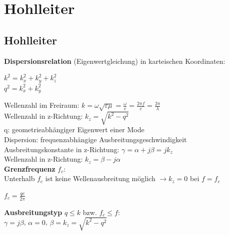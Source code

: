 \documentclass[english]{latex4ei/latex4ei_sheet}
\begin{document}
\section{Hohlleiter}
\begin{sectionbox}
	\subsection{Hohlleiter}
	\textbf{Dispersionsrelation} (Eigenwertgleichung) in karteischen Koordinaten:
	\begin{emphbox}
		$k^{2}=k_{x}^{2}+k_{y}^{2}+k_{z}^{2}$\\
		$q^2 = k_{x}^{2}+k_{y}^{2}$
	\end{emphbox}
	Wellenzahl im Freiraum: $k = \omega\sqrt{\varepsilon \mu} = \frac{\omega}{c} = \frac{2\pi f}{c} = \frac{2\pi}{\lambda}$\\
	Wellenzahl in z-Richtung: $k_z = \sqrt{k^2 - q^2}$\\
	q: geometrieabhängiger Eigenwert einer Mode\\
	Dispersion: frequenzabhängige Ausbreitungsgeschwindigkeit\\

	Ausbreitungskonstante in z-Richtung: $\gamma = \alpha + j\beta = jk_z$\\
	Wellenzahl in z-Richtung: $ k_z = \beta - j \alpha$\\

	\textbf{Grenzfrequenz} $f_c$:\\
	Unterhalb $f_c$ ist keine Wellenausbreitung möglich $\rightarrow k_z = 0$ bei $f = f_c$ 
	\begin{emphbox}
		$f_c = \frac{qc}{2\pi}$
	\end{emphbox}
	
	\textbf{Ausbreitungstyp} $q\leq k$ bzw. $f_c \leq f$:\\
	$\gamma = j\beta$, $\alpha=0$, $\beta = k_z = \sqrt{k^2 - q^2}$\\


\end{sectionbox}
\end{document}

